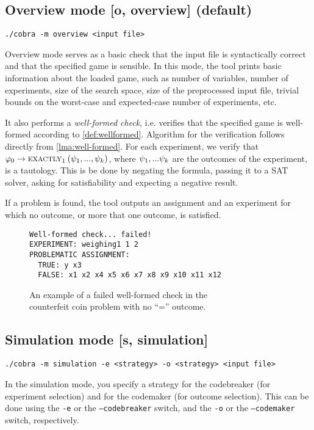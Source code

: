 \subsection{Overview mode [o, overview] (default)}

\centerline{\texttt{./cobra -m overview <input file> }}
\medskip

Overview mode serves as a basic check that the input file is
  syntactically correct and that the specified game is sensible.
In this mode, the tool prints basic information about the loaded game, such as
  number of variables, number of experiments, size of the search space,
  size of the preprocessed input file,
  trivial bounds on the worst-case and expected-case number of experiments, etc.

It also performs a \emph{well-formed check}, i.e. verifies that the
  specified game is well-formed according to \autoref{def:wellformed}.
Algorithm for the verification follows directly from \autoref{lma:well-formed}.
For each experiment, we verify that
  $\varphi_0->\textsc{exactly}_{1}\:(\psi_1, ..., \psi_k)$,
  where $\psi_1,...\psi_k$ are the outcomes of the experiment,
  is a tautology.
This is be done by negating the formula,
  passing it to a SAT solver, asking for satisfiability
  and expecting a negative result.

If a problem is found, the tool outputs an assignment and an experiment
  for which no outcome, or more that one outcome, is satisfied.

\begin{figure}[ht]
\begin{lstlisting}[xleftmargin=.2\textwidth]
Well-formed check... failed!
EXPERIMENT: weighing1 1 2
PROBLEMATIC ASSIGNMENT:
  TRUE: y x3
  FALSE: x1 x2 x4 x5 x6 x7 x8 x9 x10 x11 x12
\end{lstlisting}
\caption{An example of a failed well-formed check in the\\ counterfeit coin problem
 with no ``='' outcome.}
\end{figure}

\subsection{Simulation mode [s, simulation]}

\centerline{\texttt{./cobra -m simulation -e <strategy> -o <strategy> <input file> }}

In the simulation mode, you specify a strategy
  for the codebreaker (for experiment selection)
  and for the codemaker (for outcome selection).
This can be done using the \texttt{-e} or the \texttt{--codebreaker} switch, and
the \texttt{-o} or the \texttt{--codemaker} switch, respectively.

